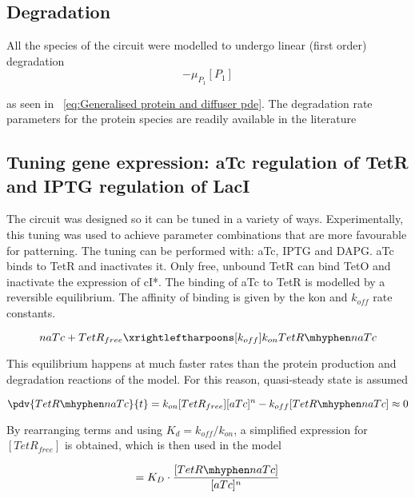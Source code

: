 \subsection{Degradation}
All the species of the circuit were modelled to undergo linear (first order) degradation
\begin{equation}
    -\mu_{P_{1}}[P_{1}]
\end{equation}

as seen in ~\eqref{eq:Generalised protein and diffuser pde}.
The degradation rate parameters for the protein species are readily available in the literature

\subsection{Tuning gene expression: aTc regulation of TetR and IPTG regulation of LacI }
The circuit was designed so it can be tuned in a variety of ways.
Experimentally, this tuning was used to achieve parameter combinations that are more favourable for patterning.
The tuning can be performed with: aTc, IPTG and DAPG.
aTc binds to TetR and inactivates it.
Only free, unbound TetR can bind TetO and inactivate the expression of cI*.
The binding of aTc to TetR is modelled by a reversible equilibrium.
The affinity of binding is given by the kon and $k_{off}$ rate constants.

\begin{equation}
    naTc + TetR_{free} \xrightleftharpoons[k_{off}]{k_{on}} TetR \mhyphen naTc
\end{equation}

This equilibrium happens at much faster rates than the protein production and degradation reactions of the model.
For this reason, quasi-steady state is assumed

\begin{equation}
    \pdv{TetR \mhyphen naTc}{t} = k_{on}[TetR_{free}][aTc]^n - k_{off}[TetR \mhyphen naTc] \approx 0
\end{equation}

By rearranging terms and using $K_{d} = k_{off}/k_{on}$, a simplified expression for $[TetR_{free}]$ is obtained, which is then used in the model

\begin{equation}
[TetR_{free}] = K_{D}\cdot \frac{[TetR \mhyphen naTc]}{[aTc]^n}
\end{equation}

